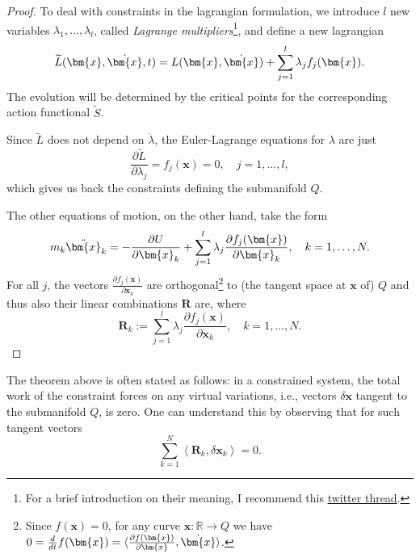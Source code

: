 \documentclass[english,fontsize=11pt,paper=a5,oneside]{scrbook}
\newcommand{\R}{\mathbb{R}}
\newcommand{\bx}{\bm{x}}
\newcommand{\lag}{\langle}
\newcommand{\rag}{\rangle}
\theoremstyle{definition}
\newenvironment{remark}
  {\pushQED{\qed}\renewcommand{\qedsymbol}{$\lozenge$}\remarkx}
  {\popQED\endremarkx}
\begin{document}
\begin{proof}
  To deal with constraints in the lagrangian formulation, we introduce $l$ new variables $\lambda_1, \ldots, \lambda_l$, called \emph{Lagrange multipliers}\footnote{For a brief introduction on their meaning, I recommend this \href{https://twitter.com/j\_bertolotti/status/1569324058633801729}{twitter thread}.}, and define a new lagrangian
  \begin{equation}
    \widetilde L(\bx, \dot\bx, t) = L(\bx, \dot\bx) + \sum_{j=1}^l \lambda_j f_j(\bx).
  \end{equation}
  The evolution will be determined by the critical points for the corresponding action functional $\widetilde S$.

  Since $\widetilde L$ does not depend on $\dot\lambda$, the Euler-Lagrange equations for $\lambda$ are just
  \begin{equation}
    \frac{\partial \widetilde L}{\partial \lambda_j} = f_j(\bx) = 0,\quad j=1,\ldots,l,
  \end{equation}
  which gives us back the constraints defining the submanifold $Q$.

  The other equations of motion, on the other hand, take the form
  \begin{equation}\label{eq:newtconstr}
    m_k \ddot \bx_k = -\frac{\partial U}{\partial\bx_k} + \sum_{j=1}^l \lambda_j \frac{\partial f_j(\bx)}{\partial \bx_k},
    \quad k=1,\ldots,N.
  \end{equation}
  For all $j$, the vectors $\frac{\partial f_j(\bx)}{\partial \bx_k}$ are orthogonal\footnote{Since $f(\bx) = 0$, for any curve $\bx:\R\to Q$ we have $0 = \frac{d}{dt} f(\bx) = \lag \frac{\partial f(\bx)}{\partial \bx}, \dot\bx \rag$.} to (the tangent space at $\bx$ of) $Q$ and thus also their linear combinations $\bm{R}$ are, where
  \begin{equation}
    \bm{R}_k := \sum_{j=1}^l \lambda_j \frac{\partial f_j(\bx)}{\partial \bx_k},
    \quad k=1,\ldots,N.
  \end{equation}
\end{proof}

\begin{remark}
  The theorem above is often stated as follows: in a constrained system, the total work of the constraint forces on any virtual variations, i.e., vectors $\delta\bx$ tangent to the submanifold $Q$, is zero.
  One can understand this by observing that for such tangent vectors
  \begin{equation}\label{eq:orthogonalconstraint}
    \sum_{k=1}^N \left\lag\bm{R}_k, \delta\bx_k\right\rag = 0.
  \end{equation}
\end{remark}
\end{document}
